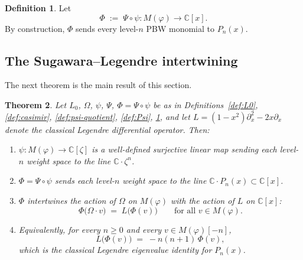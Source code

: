 \documentclass[12pt]{amsart}
\theoremstyle{plain}
\newtheorem{theorem}{Theorem}[section]
\theoremstyle{definition}
\newtheorem{definition}[theorem]{Definition}
\newcommand{\CC}{\mathbb{C}}
\newcommand{\Mf}{M(\varphi)}          %
\newcommand{\Om}{\Omega}              %
\begin{document}
\begin{definition}
\label{def:Phi-composite}
Let
\[
  \Phi \;:=\; \Psi\circ\psi \colon \Mf\longrightarrow \CC[x].
\]
By construction, $\Phi$ sends every level-$n$ PBW monomial to $P_n(x)$.
\end{definition}

\subsection{The Sugawara--Legendre intertwining}
\label{subsec:sugawara-legendre}

The next theorem is the main result of this section.
\begin{theorem}
\label{thm:rep-mechanism}
Let $L_0$, $\Om$, $\psi$, $\Psi$, $\Phi=\Psi\circ\psi$ be as in
Definitions~\ref{def:L0}, \ref{def:casimir}, \ref{def:psi-quotient},
\ref{def:Psi}, \ref{def:Phi-composite}, and let $L = (1-x^2)\partial_x^2
-2x\partial_x$ denote the classical Legendre differential operator.
Then:
\begin{enumerate}[label=(\roman*)]
  \item\label{item:repmech-psi}
    $\psi\colon \Mf\to\CC[\zeta]$ is a well-defined surjective linear map
    sending each level-$n$ weight space to the line $\CC\cdot \zeta^n$.
  \item\label{item:repmech-Phi-image}
    $\Phi=\Psi\circ\psi$ sends each level-$n$ weight space to the line
    $\CC\cdot P_n(x)\subset\CC[x]$.
  \item\label{item:repmech-Phi-Omega-L}
    $\Phi$ intertwines the action of $\Om$ on $\Mf$ with the action of
    $L$ on $\CC[x]$:
    \begin{equation}\label{eq:repmech-intertwine}
      \Phi\bigl(\Om\cdot v\bigr) \;=\; L\bigl(\Phi(v)\bigr)
      \qquad\text{for all }v\in \Mf.
    \end{equation}
  \item\label{item:repmech-eigenvalue}
    Equivalently, for every $n\geq 0$ and every $v\in\Mf[-n]$,
    \begin{equation}\label{eq:repmech-eigen}
      L\bigl(\Phi(v)\bigr) \;=\; -n(n+1)\,\Phi(v),
    \end{equation}
    which is the classical Legendre eigenvalue identity for $P_n(x)$.
\end{enumerate}
\end{theorem}
\end{document}
